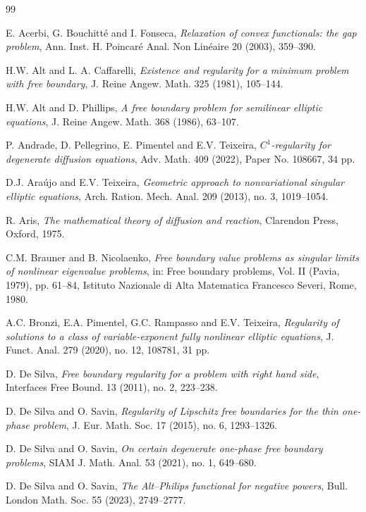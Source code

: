 \documentclass[reqno,11pt]{amsart}
\newcommand{\1}{\mathds{1}}
\numberwithin{equation}{section}
\begin{document}
\begin{thebibliography}{99} 

 E. Acerbi,  G. Bouchitt\'e and I. Fonseca, 
{\it Relaxation of convex functionals: the gap problem}, 
Ann. Inst. H. Poincar\'e Anal. Non Lin\'eaire 20 (2003), 359--390. 

 H.W. Alt and L. A. Caffarelli,  
{\it Existence and regularity for a minimum problem with free boundary},
J. Reine Angew. Math. 325 (1981), 105--144.

 H.W. Alt and D. Phillips, 
{\it A free boundary problem for semilinear elliptic equations},  
J. Reine Angew. Math. 368 (1986), 63--107.

 P. Andrade, D. Pellegrino, E. Pimentel and E.V. Teixeira,
{\it $C^1$-regularity for degenerate diffusion equations},
Adv. Math. 409 (2022), Paper No. 108667, 34 pp.

 D.J. Ara\'ujo and E.V. Teixeira, 
{\it Geometric approach to nonvariational singular elliptic equations}, 
Arch. Ration. Mech. Anal. 209 (2013), no. 3, 1019--1054.

 R. Aris, 
\textit{The mathematical theory of diffusion and reaction}, 
Clarendon Press, Oxford, 1975.

 C.M. Brauner and B. Nicolaenko,
\textit{Free boundary value problems as singular limits of nonlinear eigenvalue problems}, 
in: Free boundary problems, Vol. II (Pavia, 1979), pp. 61--84, Istituto Nazionale di Alta Matematica Francesco Severi, Rome, 1980.

 A.C. Bronzi, E.A. Pimentel, G.C. Rampasso and E.V. Teixeira, 
{\it Regularity of solutions to a class of variable-exponent fully nonlinear elliptic equations},   
J. Funct. Anal. 279 (2020), no. 12, 108781, 31 pp. 

 D. De Silva, 
{\it Free boundary regularity for a problem with right hand side}, 
Interfaces Free Bound. 13 (2011), no. 2, 223--238. 

 D. De Silva and O. Savin, 
{\it Regularity of Lipschitz free boundaries for the thin one-phase problem}, 
J. Eur. Math. Soc. 17 (2015), no. 6, 1293--1326.

 D. De Silva and O. Savin, 
{\it On certain degenerate one-phase free boundary problems}, 
SIAM J. Math. Anal. 53 (2021), no. 1, 649--680. 

 D. De Silva and O. Savin, 
{\it The Alt--Philips functional for negative powers}, 
Bull. London Math. Soc. 55 (2023), 2749--2777. 


\end{thebibliography}
\end{document}
